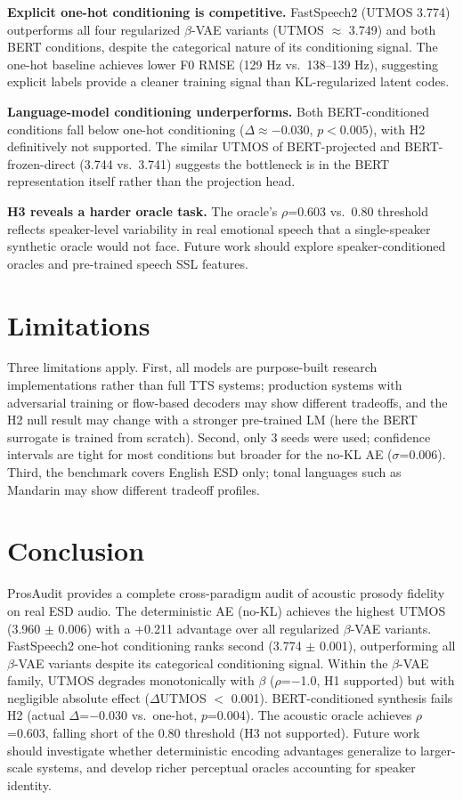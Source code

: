 \documentclass{article}
\begin{document}
\textbf{Explicit one-hot conditioning is competitive.} FastSpeech2 (UTMOS 3.774) outperforms all four regularized $\beta$-VAE variants (UTMOS $\approx$ 3.749) and both BERT conditions, despite the categorical nature of its conditioning signal. The one-hot baseline achieves lower F0 RMSE (129 Hz vs.\ 138--139 Hz), suggesting explicit labels provide a cleaner training signal than KL-regularized latent codes.

\textbf{Language-model conditioning underperforms.} Both BERT-conditioned conditions fall below one-hot conditioning ($\Delta \approx -0.030$, $p < 0.005$), with H2 definitively not supported. The similar UTMOS of BERT-projected and BERT-frozen-direct (3.744 vs.\ 3.741) suggests the bottleneck is in the BERT representation itself rather than the projection head.

\textbf{H3 reveals a harder oracle task.} The oracle's $\rho$=0.603 vs.\ 0.80 threshold reflects speaker-level variability in real emotional speech that a single-speaker synthetic oracle would not face. Future work should explore speaker-conditioned oracles and pre-trained speech SSL features.

\section{Limitations}

\label{sec:limitations}

Three limitations apply. First, all models are purpose-built research implementations rather than full TTS systems; production systems with adversarial training or flow-based decoders may show different tradeoffs, and the H2 null result may change with a stronger pre-trained LM (here the BERT surrogate is trained from scratch). Second, only 3 seeds were used; confidence intervals are tight for most conditions but broader for the no-KL AE ($\sigma$=0.006). Third, the benchmark covers English ESD only; tonal languages such as Mandarin may show different tradeoff profiles.

\section{Conclusion}

\label{sec:conclusion}

ProsAudit provides a complete cross-paradigm audit of acoustic prosody fidelity on real ESD audio. The deterministic AE (no-KL) achieves the highest UTMOS (3.960 $\pm$ 0.006) with a +0.211 advantage over all regularized $\beta$-VAE variants. FastSpeech2 one-hot conditioning ranks second (3.774 $\pm$ 0.001), outperforming all $\beta$-VAE variants despite its categorical conditioning signal. Within the $\beta$-VAE family, UTMOS degrades monotonically with $\beta$ ($\rho$=$-$1.0, H1 supported) but with negligible absolute effect ($\Delta$UTMOS $<$ 0.001). BERT-conditioned synthesis fails H2 (actual $\Delta$=$-$0.030 vs.\ one-hot, $p$=0.004). The acoustic oracle achieves $\rho$=0.603, falling short of the 0.80 threshold (H3 not supported). Future work should investigate whether deterministic encoding advantages generalize to larger-scale systems, and develop richer perceptual oracles accounting for speaker identity.
\end{document}

